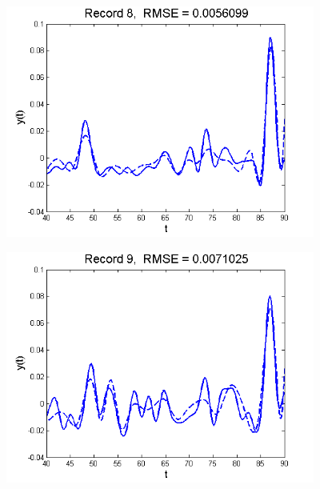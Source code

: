 \documentclass[11pt]{beamer}
\begin{document}
\begin{frame}

\begin{center}
\includegraphics[width=4in]{figs/SelTIC_fit8.png}
\end{center}

\end{frame}


\begin{frame}

\begin{center}
\includegraphics[width=4in]{figs/SelTIC_fit9.png}
\end{center}

\end{frame}

\end{document}
